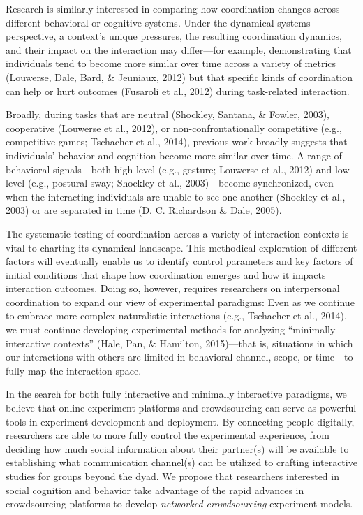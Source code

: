 \documentclass[10pt, letterpaper]{article}
\begin{document}
Research is similarly interested in comparing how coordination changes
across different behavioral or cognitive systems. Under the dynamical
systems perspective, a context's unique pressures, the resulting
coordination dynamics, and their impact on the interaction may
differ---for example, demonstrating that individuals tend to become more
similar over time across a variety of metrics (Louwerse, Dale, Bard, \&
Jeuniaux, 2012) but that specific kinds of coordination can help or hurt
outcomes (Fusaroli et al., 2012) during task-related interaction.

Broadly, during tasks that are neutral (Shockley, Santana, \& Fowler,
2003), cooperative (Louwerse et al., 2012), or non-confrontationally
competitive (e.g., competitive games; Tschacher et al., 2014), previous
work broadly suggests that individuals' behavior and cognition become
more similar over time. A range of behavioral signals---both high-level
(e.g., gesture; Louwerse et al., 2012) and low-level (e.g., postural
sway; Shockley et al., 2003)---become synchronized, even when the
interacting individuals are unable to see one another (Shockley et al.,
2003) or are separated in time (D. C. Richardson \& Dale, 2005).

The systematic testing of coordination across a variety of interaction
contexts is vital to charting its dynamical landscape. This methodical
exploration of different factors will eventually enable us to identify
control parameters and key factors of initial conditions that shape how
coordination emerges and how it impacts interaction outcomes. Doing so,
however, requires researchers on interpersonal coordination to expand
our view of experimental paradigms: Even as we continue to embrace more
complex naturalistic interactions (e.g., Tschacher et al., 2014), we
must continue developing experimental methods for analyzing ``minimally
interactive contexts'' (Hale, Pan, \& Hamilton, 2015)---that is,
situations in which our interactions with others are limited in
behavioral channel, scope, or time---to fully map the interaction space.

In the search for both fully interactive and minimally interactive
paradigms, we believe that online experiment platforms and crowdsourcing
can serve as powerful tools in experiment development and deployment. By
connecting people digitally, researchers are able to more fully control
the experimental experience, from deciding how much social information
about their partner(s) will be available to establishing what
communication channel(s) can be utilized to crafting interactive studies
for groups beyond the dyad. We propose that researchers interested in
social cognition and behavior take advantage of the rapid advances in
crowdsourcing platforms to develop \emph{networked crowdsourcing}
experiment models.
\end{document}
